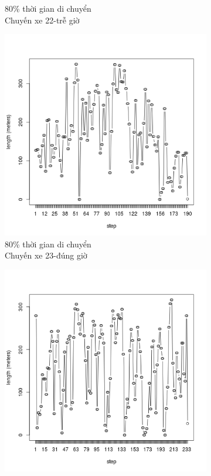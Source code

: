 \documentclass[a4paper, 13pt]{report}
\begin{document}
\begin{figure}
\begin{subfigure}[b]{0.25\textwidth}
                \caption*{80\% thời gian di chuyển\\Chuyến xe 22-trễ giờ}
        \end{subfigure}%
        \begin{subfigure}[b]{0.25\textwidth}
                \includegraphics[width=\linewidth]{test23}
                \caption*{80\% thời gian di chuyển\\Chuyến xe 23-đúng giờ}
        \end{subfigure}%
        \begin{subfigure}[b]{0.25\textwidth}
                \includegraphics[width=\linewidth]{test24}

\end{subfigure}
\end{figure}
\end{document}
